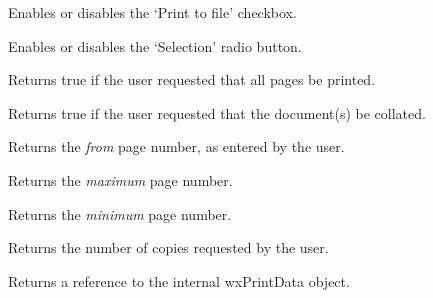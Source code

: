 Enables or disables the `Print to file' checkbox.

\label{wxprintdialogdataenableselection}


Enables or disables the `Selection' radio button.

\label{wxprintdialogdatagetallpages}


Returns true if the user requested that all pages be printed.

\label{wxprintdialogdatagetcollate}


Returns true if the user requested that the document(s) be collated.

\label{wxprintdialogdatagetfrompage}


Returns the {\it from} page number, as entered by the user.

\label{wxprintdialogdatagetmaxpage}


Returns the {\it maximum} page number.

\label{wxprintdialogdatagetminpage}


Returns the {\it minimum} page number.

\label{wxprintdialogdatagetnocopies}


Returns the number of copies requested by the user.

\label{wxprintdialogdatagetprintdata}


Returns a reference to the internal wxPrintData object.

\label{wxprintdialogdatagetprinttofile}

